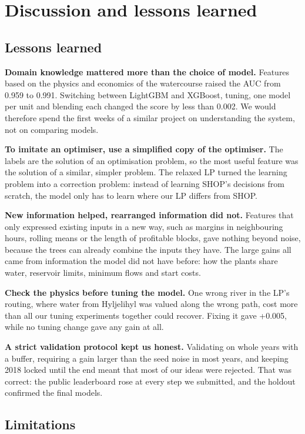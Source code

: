 \section{Discussion and lessons learned}\label{sec:9}

\subsection{Lessons learned}\label{sec:9.lessons}

\textbf{Domain knowledge mattered more than the choice of model.} Features based on the physics and economics of the watercourse raised the AUC from 0.959 to 0.991. Switching between LightGBM and XGBoost, tuning, one model per unit and blending each changed the score by less than 0.002. We would therefore spend the first weeks of a similar project on understanding the system, not on comparing models.

\textbf{To imitate an optimiser, use a simplified copy of the optimiser.} The labels are the solution of an optimisation problem, so the most useful feature was the solution of a similar, simpler problem. The relaxed LP turned the learning problem into a correction problem: instead of learning SHOP's decisions from scratch, the model only has to learn where our LP differs from SHOP.

\textbf{New information helped, rearranged information did not.} Features that only expressed existing inputs in a new way, such as margins in neighbouring hours, rolling means or the length of profitable blocks, gave nothing beyond noise, because the trees can already combine the inputs they have. The large gains all came from information the model did not have before: how the plants share water, reservoir limits, minimum flows and start costs.

\textbf{Check the physics before tuning the model.} One wrong river in the LP's routing, where water from Hyljelihyl was valued along the wrong path, cost more than all our tuning experiments together could recover. Fixing it gave +0.005, while no tuning change gave any gain at all.

\textbf{A strict validation protocol kept us honest.} Validating on whole years with a buffer, requiring a gain larger than the seed noise in most years, and keeping 2018 locked until the end meant that most of our ideas were rejected. That was correct: the public leaderboard rose at every step we submitted, and the holdout confirmed the final models.

\subsection{Limitations}\label{sec:9.limitations}

